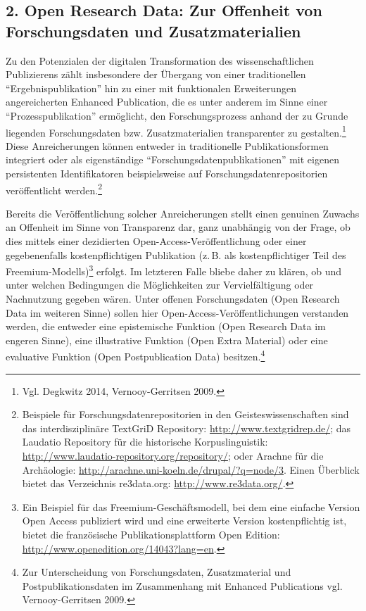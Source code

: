\documentclass[a4paper,
fontsize=11pt,
oneside,
numbers=noperiodatend,
parskip=half-,
bibliography=totoc,
final
]{scrartcl}
\begin{document}
\subsection{2. Open Research Data: Zur Offenheit von Forschungsdaten und
Zusatzmaterialien}\label{open-research-data-zur-offenheit-von-forschungsdaten-und-zusatzmaterialien}

Zu den Potenzialen der digitalen Transformation des wissenschaftlichen
Publizierens zählt insbesondere der Übergang von einer traditionellen
\enquote{Ergebnispublikation} hin zu einer mit funktionalen
Erweiterungen angereicherten Enhanced Publication, die es unter anderem
im Sinne einer \enquote{Prozesspublikation} ermöglicht, den
Forschungsprozess anhand der zu Grunde liegenden Forschungsdaten bzw.
Zusatzmaterialien transparenter zu gestalten.\footnote{Vgl. Degkwitz
  2014, Vernooy-Gerritsen 2009.} Diese Anreicherungen können entweder in
traditionelle Publikationsformen integriert oder als eigenständige
\enquote{Forschungsdatenpublikationen} mit eigenen persistenten
Identifikatoren beispielsweise auf Forschungsdatenrepositorien
veröffentlicht werden.\footnote{Beispiele für
  Forschungsdatenrepositorien in den Geisteswissenschaften sind das
  interdisziplinäre TextGriD Repository:
  \url{http://www.textgridrep.de/}; das Laudatio Repository für die
  historische Korpuslinguistik:
  \url{http://www.laudatio-repository.org/repository/}; oder Arachne für
  die Archäologie:
  \href{http://arachne.uni-koeln.de/drupal/?q=de/node/3}{http://arachne.uni-koeln.de/drupal/?q=node/3}.
  Einen Überblick bietet das Verzeichnis re3data.org:
  \url{http://www.re3data.org/}.}

Bereits die Veröffentlichung solcher Anreicherungen stellt einen
genuinen Zuwachs an Offenheit im Sinne von Transparenz dar, ganz
unabhängig von der Frage, ob dies mittels einer dezidierten
Open-Access-Veröffentlichung oder einer gegebenenfalls kostenpflichtigen
Publikation (z.\,B. als kostenpflichtiger Teil des
Freemium-Modells)\footnote{Ein Beispiel für das
  Freemium-Geschäftsmodell, bei dem eine einfache Version Open Access
  publiziert wird und eine erweiterte Version kostenpflichtig ist,
  bietet die französische Publikationsplattform Open Edition:
  \url{http://www.openedition.org/14043?lang=en}.} erfolgt. Im letzteren
Falle bliebe daher zu klären, ob und unter welchen Bedingungen die
Möglichkeiten zur Vervielfältigung oder Nachnutzung gegeben wären. Unter
offenen Forschungsdaten (Open Research Data im weiteren Sinne) sollen
hier Open-Access-Veröffentlichungen verstanden werden, die entweder eine
epistemische Funktion (Open Research Data im engeren Sinne), eine
illustrative Funktion (Open Extra Material) oder eine evaluative
Funktion (Open Postpublication Data) besitzen.\footnote{Zur
  Unterscheidung von Forschungsdaten, Zusatzmaterial und
  Postpublikationsdaten im Zusammenhang mit Enhanced Publications vgl.
  Vernooy-Gerritsen 2009.}
\end{document}
